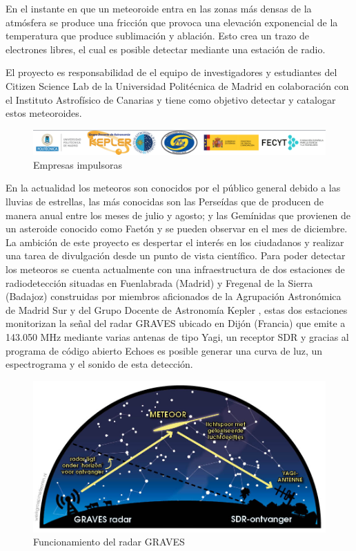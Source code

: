 En el instante en que un meteoroide entra en las zonas más densas de la atmósfera se produce una fricción que provoca una elevación exponencial de la temperatura que produce sublimación y ablación. 
Esto crea un trazo de electrones libres, el cual es posible detectar mediante una estación de radio.

El proyecto es responsabilidad de el equipo de investigadores y estudiantes del Citizen Science Lab de la Universidad Politécnica de Madrid en colaboración con el Instituto Astrofísico de Canarias y tiene como objetivo detectar y catalogar estos meteoroides.


\vspace{0.5cm}

\begin{figure} [h]
    \centering
    \includegraphics[width=\textwidth]{include/figuras/Empresas_proyecto.png}
    \caption{Empresas impulsoras}
    \label{fig:empresas}
\end{figure}

En la actualidad los meteoros son conocidos por el público general debido a las lluvias de estrellas, las más conocidas son las Perseídas que de producen de manera anual entre los meses de julio y agosto; y las Gemínidas que provienen de un asteroide conocido como Faetón y se pueden observar en el mes de diciembre. La ambición de este proyecto es despertar el interés en los ciudadanos y realizar una tarea de divulgación desde un punto de vista científico. 
Para poder detectar los meteoros se cuenta actualmente con una infraestructura de dos estaciones de radiodetección situadas en Fuenlabrada (Madrid) y Fregenal de la Sierra (Badajoz) construidas por miembros aficionados de la Agrupación Astronómica de Madrid Sur y del Grupo Docente de Astronomía Kepler \cite{kepler}, estas dos estaciones monitorizan la señal del radar GRAVES \cite{graves} ubicado en Dijón (Francia) que emite a 143.050 MHz mediante varias antenas de tipo Yagi, un receptor SDR \cite{ulversoy2010software} y gracias al programa de código abierto Echoes \cite{echoes} es posible generar una curva de luz, un espectrograma y el sonido de esta detección. 

\begin{figure} [h]
    \centering
    \includegraphics[scale=0.35]{include/figuras/Radar.jpg}
    \caption{Funcionamiento del radar GRAVES}
    \label{fig:radar}
\end{figure}

